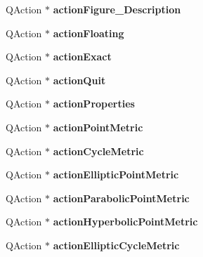 \begin{DoxyCompactItemize}
Q\+Action $\ast$ {\bfseries action\+Figure\+\_\+\+Description}
\item 
\mbox{\label{class_ui___main_window_a8d48131a3b17a8b4c8a22b0b65b19494}} 
Q\+Action $\ast$ {\bfseries action\+Floating}
\item 
\mbox{\label{class_ui___main_window_a034f279001e76e3be73ed5b4bd07c59a}} 
Q\+Action $\ast$ {\bfseries action\+Exact}
\item 
\mbox{\label{class_ui___main_window_a188c243f36a2dbc10e4e2a0ad94273b1}} 
Q\+Action $\ast$ {\bfseries action\+Quit}
\item 
\mbox{\label{class_ui___main_window_adc69c1d59f56327ab1e42fd985f66b49}} 
Q\+Action $\ast$ {\bfseries action\+Properties}
\item 
\mbox{\label{class_ui___main_window_a8b35f735472c004ad6b1ebd82bb2ed79}} 
Q\+Action $\ast$ {\bfseries action\+Point\+Metric}
\item 
\mbox{\label{class_ui___main_window_af6823cd17f39bc0f6b94a026476eefa1}} 
Q\+Action $\ast$ {\bfseries action\+Cycle\+Metric}
\item 
\mbox{\label{class_ui___main_window_a58d0ba1b7beeed28ad5465133e240ab1}} 
Q\+Action $\ast$ {\bfseries action\+Elliptic\+Point\+Metric}
\item 
\mbox{\label{class_ui___main_window_a5706347a779fae5ae488492ed8607e4a}} 
Q\+Action $\ast$ {\bfseries action\+Parabolic\+Point\+Metric}
\item 
\mbox{\label{class_ui___main_window_a3e8849e6122bf0467b541bdbe5b570a2}} 
Q\+Action $\ast$ {\bfseries action\+Hyperbolic\+Point\+Metric}
\item 
\mbox{\label{class_ui___main_window_a5d74c24d7075548a7674541fe000b632}} 
Q\+Action $\ast$ {\bfseries action\+Elliptic\+Cycle\+Metric}
\item 
\mbox{\label{class_ui___main_window_a73235643255b09b0481df8b7f5206590}} 

\end{DoxyCompactItemize}
